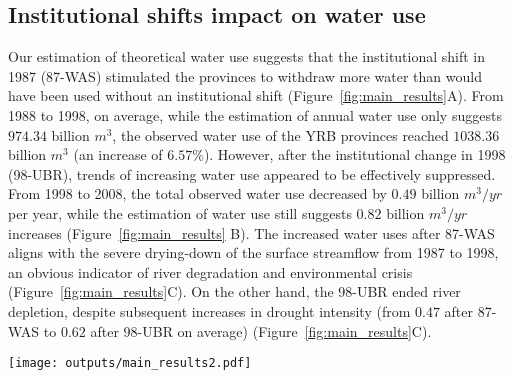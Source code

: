 
\subsection{Institutional shifts impact on water use}
\label{result-2}

\label{result-1-p2}
Our estimation of theoretical water use suggests that the institutional shift in 1987 (87-WAS) stimulated the provinces to withdraw more water than would have been used without an institutional shift (Figure~\ref{fig:main_results}A).
From 1988 to 1998, on average, while the estimation of annual water use only suggests $974.34$ billion $m^3$, the observed water use of the YRB provinces reached $1038.36$ billion $m^3$ (an increase of $6.57\%$).
However, after the institutional change in 1998 (98-UBR), trends of increasing water use appeared to be effectively suppressed. From 1998 to 2008, the total observed water use decreased by $0.49$ billion $m^3/yr$ per year, while the estimation of water use still suggests $0.82$ billion $m^3/yr$ increases (Figure~\ref{fig:main_results} B).
The increased water uses after 87-WAS aligns with the severe drying-down of the surface streamflow from 1987 to 1998, an obvious indicator of river degradation and environmental crisis (Figure~\ref{fig:main_results}C).
On the other hand, the 98-UBR ended river depletion, despite subsequent increases in drought intensity (from $0.47$ after 87-WAS to $0.62$ after 98-UBR on average) (Figure~\ref{fig:main_results}C).

\begin{figure*}[!tb]
    \centering
    \texttt{[image: outputs/main\_results2.pdf]}
    \caption{
        Effects of two institutional shifts on water resources use and allocation in the Yellow River Basin (YRB).
        \textbf{A.} water uses of the YRB before and after the institutional shift in 1987 (87-WAS);
        \textbf{B.} water uses of the YRB before and after the institutional shift in 1998 (98-UBR). Blue lines are statistics derived from water use data; grey lines are estimates from the Differenced Synthetic Control method with economic and environmental background controlled;
        \textbf{C.} Drought intensity in the YRB and drying up events of the Yellow River. The size of the grey bubbles denotes the length of drying upstream.
    }
    \label{fig:main_results}
\end{figure*}


